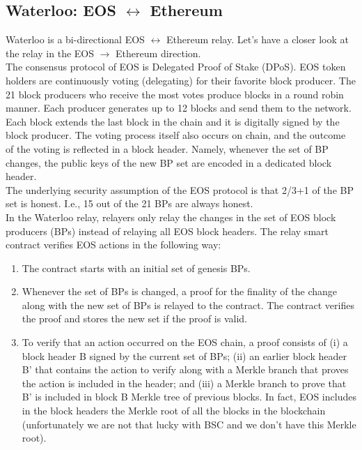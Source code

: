 \subsection{Waterloo:  EOS $\leftrightarrow$ Ethereum}
Waterloo is a bi-directional EOS $\leftrightarrow$ Ethereum relay. Let's have a closer look at the relay in the EOS $\rightarrow$ Ethereum direction.\\The consensus protocol of EOS is Delegated Proof of Stake (DPoS). EOS token holders are continuously voting (delegating) for their favorite block producer. The 21 block producers who receive the most votes produce blocks in a round robin manner. Each producer generates up to 12 blocks and send them to the network. Each block extends the last block in the chain and it is digitally signed by the block producer. The voting process itself also occurs on chain, and the outcome of the voting is reflected in a block header. Namely, whenever the set of BP changes, the public keys of the new BP set are encoded in a dedicated block header. \\The underlying security assumption of the EOS protocol is that 2/3+1 of the BP set is honest. I.e., 15 out of the 21 BPs are always honest. \\In the Waterloo relay, relayers only relay the changes in the set of EOS block producers (BPs) instead of relaying all EOS block headers. The relay smart contract verifies EOS actions in the following way:
\begin{enumerate}
    \item The contract starts with an initial set of genesis BPs.
    \item Whenever the set of BPs is changed, a proof for the finality of the change along with the new set of BPs is relayed to the contract. The contract verifies the proof and stores the new set if the proof is valid.
    \item To verify that an action occurred on the EOS chain, a proof consists of (i) a block header B signed by the current set of BPs; (ii) an earlier block header B’ that contains the action to verify along with a Merkle branch that proves the action is included in the header; and (iii) a Merkle branch to prove that B’ is included in block B Merkle tree of previous blocks. In fact, EOS includes in the block headers the Merkle root of all the blocks in the blockchain (unfortunately we are not that lucky with BSC and we don't have this Merkle root).
\end{enumerate}


